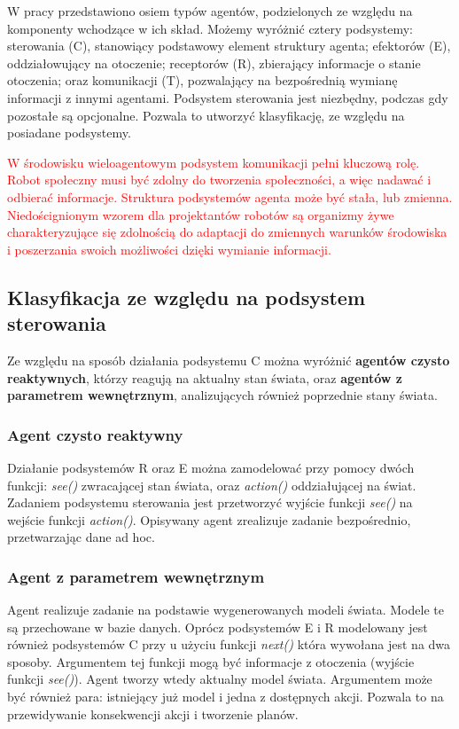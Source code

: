 W pracy \cite{ZIEL} przedstawiono osiem typów agentów, podzielonych ze względu na komponenty wchodzące w ich skład. Możemy wyróżnić cztery podsystemy: sterowania (C), stanowiący podstawowy element struktury agenta; efektorów (E), oddziałowujący na otoczenie; receptorów (R), zbierający informacje o stanie otoczenia; oraz komunikacji (T), pozwalający na bezpośrednią wymianę informacji z innymi agentami. Podsystem sterowania jest niezbędny, podczas gdy pozostałe są opcjonalne. Pozwala to utworzyć klasyfikację, ze względu na posiadane podsystemy. %

\textcolor{red}{W środowisku wieloagentowym podsystem komunikacji pełni kluczową rolę. Robot społeczny musi być zdolny do tworzenia społeczności, a więc nadawać i odbierać informacje. Struktura podsystemów agenta może być stała, lub zmienna. Niedoścignionym wzorem dla projektantów robotów są organizmy żywe charakteryzujące się zdolnością do adaptacji do zmiennych warunków środowiska i poszerzania swoich możliwości dzięki wymianie informacji.}

\subsection{Klasyfikacja ze względu na podsystem sterowania}

Ze względu na sposób działania podsystemu C można wyróżnić \textbf{agentów czysto reaktywnych}, którzy reagują na aktualny stan świata, oraz \textbf{agentów z parametrem wewnętrznym}, analizujących również poprzednie stany świata. \cite{GNAT}

\subsubsection{Agent czysto reaktywny}

Działanie podsystemów R oraz E można zamodelować przy pomocy dwóch funkcji: \textit{see()} zwracającej stan świata, oraz \textit{action()} oddziałującej na świat. Zadaniem podsystemu sterowania jest przetworzyć wyjście funkcji \textit{see()} na wejście funkcji \textit{action()}. Opisywany agent zrealizuje zadanie bezpośrednio, przetwarzając dane ad hoc.

\subsubsection{Agent z parametrem wewnętrznym}

Agent realizuje zadanie na podstawie wygenerowanych modeli świata. Modele te są przechowane w bazie danych. Oprócz podsystemów E i R modelowany jest również podsystemów C przy u użyciu funkcji \textit{next()} która wywołana jest na dwa sposoby. Argumentem tej funkcji mogą być informacje z otoczenia (wyjście funkcji \textit{see()}). Agent tworzy wtedy aktualny model świata. Argumentem może być również para: istniejący już model i jedna z dostępnych akcji. Pozwala to na przewidywanie konsekwencji akcji i tworzenie planów. 

